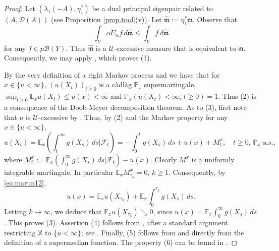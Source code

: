 \documentclass[11pt,a4paper,reqno]{amsart}
\theoremstyle{definition}
\numberwithin{equation}{section}
\begin{document}
\begin{proof}
Let $(\lambda_1(-A),\eta_1^*)$ be a dual principal eigenpair related to $(A,\mathscr D(A))$ (see Proposition \ref{prop.tool}(v)). 
Let $\hat{\mathfrak m}:= \eta_1^*\mathfrak m$. Observe that
\[
\int_Y \alpha U_\alpha f \,d\hat{\mathfrak m}\le  \int_Y f\, d \hat{\mathfrak m}
\]
for any  $f\in p\mathcal B(Y)$. Thus 
$\hat{\mathfrak m}$ is a $\mathcal U$-excessive measure that is equivalent to $\mathfrak m$.
Consequently, we may apply \cite[Proposition 2.4]{BCR}, which proves  (1). 

By the very definition of a right Markov process and  \cite[Theorem III.5.7]{BG} we have that  for 
$x\in \{u<\infty\}$, $(u(X_t))_{t\ge 0}$
is a c\`adl\`ag $\mathbb P_x$ supermartingale,  $\sup_{t\ge 0} \mathbb E_xu(X_t)\le u(x)<\infty$ and 
$\mathbb P_x(u(X_t)<\infty,\, t\ge 0)=1$. Thus (2) is a consequence of the Doob-Meyer decomposition theorem. 
As to (3), first note that $u$ is $\mathcal U$-excessive by \cite[Proposition II.2.2(e)]{BG}. Thus, by (2) and the Markov property 
for any $x\in \{u<\infty\}$,
\begin{equation}
\label{eq.marun12}
u(X_t)=\mathbb E_x\left(\int_t^\infty g(X_s)\,ds\Big|\mathcal F_t\right)
=-\int_0^tg(X_s)\,ds+u(x)+M^x_t,\quad t\ge 0,\,\mathbb P_x\text{-a.s.,}
\end{equation}
where $M^x_t:=\mathbb E_x\left(\int_0^\infty g(X_s)\,ds\Big|\mathcal F_t\right)-u(x)$. 
Clearly $M^x$ is a uniformly integrable martingale. In particular $\mathbb E_xM^x_{\tau_k}=0,\, k\ge 1$. 
Consequently, by \eqref{eq.marun12},
\[
u(x)=\mathbb E_xu(X_{\tau_k})+\mathbb E_x\int_0^{\tau_k}g(X_s)\,ds.
\]
Letting $k\to \infty$, we deduce that $\mathbb E_xu(X_{\tau_k})\searrow 0$, 
since $u(x)=\mathbb E_x\int_0^{\infty}g(X_s)\,ds$.  This proves (3). 
Assertion (4) follows from \cite[Theorem 51.7]{Sharpe}, after a standard   argument restricting 
$\mathbb X$ to $\{u<\infty\}$; see \cite[Theorem 12.23]{Sharpe}. 
Finally,  (5) follows from \cite[Exercise (2.18)]{BG} and directly from the definition of a supermedian function.
The property (6) can be found in \cite[Lemma 5.2]{FG}.
\end{proof}
\end{document}
